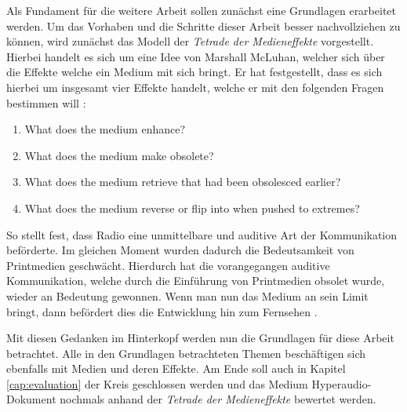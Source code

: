 \label{cha:grundlagen}
Als Fundament für die weitere Arbeit sollen zunächst eine Grundlagen erarbeitet werden. Um das Vorhaben und die Schritte dieser Arbeit besser nachvollziehen zu können, wird zunächst das Modell der \textit{Tetrade der Medieneffekte} vorgestellt. Hierbei handelt es sich um eine Idee von Marshall McLuhan, welcher sich über die Effekte welche ein Medium mit sich bringt. Er hat festgestellt, dass es sich hierbei um insgesamt vier Effekte handelt, welche er mit den folgenden Fragen bestimmen will \citep{mcluhan1977laws}:

\begin{enumerate}
\item What does the medium enhance?
\item What does the medium make obsolete?
\item What does the medium retrieve that had been obsolesced earlier?
\item What does the medium reverse or flip into when pushed to extremes?
\end{enumerate}

So stellt \cite{mcluhan1977laws} fest, dass Radio eine unmittelbare und auditive Art der Kommunikation beförderte. Im gleichen Moment wurden dadurch die Bedeutsamkeit von Printmedien geschwächt. Hierdurch hat die vorangegangen auditive Kommunikation, welche durch die Einführung von Printmedien obsolet wurde, wieder an Bedeutung gewonnen. Wenn man nun das Medium an sein Limit bringt, dann befördert dies die Entwicklung hin zum Fernsehen \citep{mcluhan1977laws}.

Mit diesen Gedanken im Hinterkopf werden nun die Grundlagen für diese Arbeit betrachtet. Alle in den Grundlagen betrachteten Themen beschäftigen sich ebenfalls mit Medien und deren Effekte. Am Ende soll auch in Kapitel \ref{cap:evaluation} der Kreis geschlossen werden und das Medium Hyperaudio-Dokument nochmals anhand der \textit{Tetrade der Medieneffekte} bewertet werden. 





